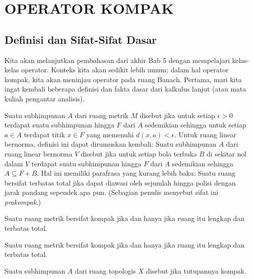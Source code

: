 \chapter{OPERATOR KOMPAK}\label{chap_cpt_ops}

\section{Definisi dan Sifat-Sifat Dasar}

Kita akan melanjutkan pembahasan dari akhir Bab 5 dengan mempelajari kelas-kelas operator.
Konteks kita akan sedikit lebih umum; dalam hal operator kompak, kita akan
meninjau operator pada ruang Banach.  Pertama, mari kita ingat kembali beberapa definisi dan
fakta dasar dari kalkulus lanjut (atau mata kuliah pengantar analisis).

\begin{defn} Suatu subhimpunan $A$ dari ruang metrik $M$ disebut
 jika untuk setiap $\epsilon > 0$ terdapat suatu subhimpunan hingga $F$ dari $A$
sedemikian sehingga untuk setiap $a \in A$ terdapat titik $x \in F$ yang memenuhi $d(x,a) < \epsilon$.
Untuk ruang linear bernorma, definisi ini dapat dirumuskan kembali: Suatu subhimpunan $A$ dari ruang linear
bernorma $V$ disebut  jika untuk setiap bola terbuka $B$ di sekitar nol dalam $V$ terdapat
suatu subhimpunan hingga $F$ dari $A$ sedemikian sehingga $A \subseteq F + B$.  Hal ini memiliki parafrasa yang kurang lebih baku:
Suatu ruang bersifat terbatas total jika dapat diawasi oleh sejumlah hingga polisi dengan jarak pandang
sependek apa pun.  (Sebagian penulis menyebut sifat ini \emph{prakompak}.)
\end{defn}

\begin{prop} Suatu ruang metrik bersifat kompak jika dan hanya jika ruang itu lengkap dan terbatas total.
\end{prop}

\begin{prop} Suatu ruang metrik bersifat kompak jika dan hanya jika ruang itu lengkap dan terbatas total.
\end{prop}

\begin{defn} Suatu subhimpunan $A$ dari ruang topologis $X$ disebut
 jika tutupannya kompak.
\end{defn}

